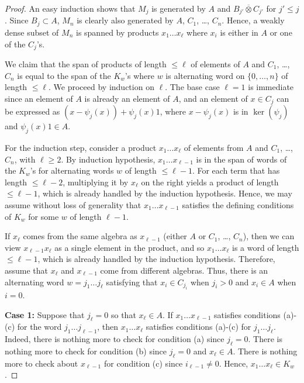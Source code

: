 \documentclass[10pt]{amsart}
\numberwithin{equation}{section}
\theoremstyle{definition}
\newcommand{\ootimes}{\mathbin{\overline{\otimes}}}
\begin{document}
\begin{proof}
	An easy induction shows that $M_j$ is generated by $A$ and $B_{j'} \ootimes C_{j'}$ for $j' \leq j$.  Since $B_j \subset A$, $M_n$ is clearly also generated by $A$, $C_1$, \dots, $C_n$.  Hence, a weakly dense subset of $M_n$ is spanned by products $x_1 \dots x_\ell$ where $x_i$ is either in $A$ or one of the $C_j$'s.
	
	We claim that the span of products of length $\leq \ell$ of elements of $A$ and $C_1$, \dots, $C_n$ is equal to the span of the $K_w$'s where $w$ is alternating word on $\{0,\dots,n\}$ of length $\leq \ell$.  We proceed by induction on $\ell$.  The base case $\ell = 1$ is immediate since an element of $A$ is already an element of $A$, and an element of $x \in C_j$ can be expressed as $(x - \psi_j(x)) + \psi_j(x)1$, where $x - \psi_j(x)$ is in $\ker(\psi_j)$ and $\psi_j(x)1 \in A$.
	
	For the induction step, consider a product $x_1 \dots x_\ell$ of elements from $A$ and $C_1$, \dots, $C_n$, with $\ell \geq 2$.  By induction hypothesis, $x_1 \dots x_{\ell - 1}$ is in the span of words of the $K_w$'s for alternating words $w$ of length $\leq \ell - 1$. For each term that has length $\leq \ell - 2$, multiplying it by $x_\ell$ on the right yields a product of length $\leq \ell - 1$, which is already handled by the induction hypothesis. Hence, we may assume without loss of generality that $x_1 \dots x_{\ell - 1}$ satisfies the defining conditions of $K_w$ for some $w$ of length $\ell - 1$.
	
	If $x_\ell$ comes from the same algebra as $x_{\ell - 1}$ (either $A$ or $C_1$, \dots, $C_n$), then we can view $x_{\ell - 1} x_\ell$ as a single element in the product, and so $x_1 \dots x_\ell$ is a word of length $\leq \ell - 1$, which is already handled by the induction hypothesis.  Therefore, assume that $x_\ell$ and $x_{\ell - 1}$ come from different algebras.  Thus, there is an alternating word $w = j_1 \dots j_\ell$ satisfying that $x_i \in C_{j_i}$ when $j_i > 0$ and $x_i \in A$ when $i = 0$. 
	
	\textbf{Case 1:} Suppose that $j_\ell = 0$ so that $x_\ell \in A$.  If $x_1 \dots x_{\ell-1}$ satisfies conditions (a)-(c) for the word $j_1 \dots j_{\ell-1}$, then $x_1 \dots x_\ell$ satisfies conditions (a)-(c) for $j_1 \dots j_\ell$.  Indeed, there is nothing more to check for condition (a) since $j_\ell = 0$.  There is nothing more to check for condition (b) since $j_\ell = 0$ and $x_\ell \in A$.  There is nothing more to check about $x_{\ell-1}$ for condition (c) since $i_{\ell-1} \neq 0$.  Hence, $x_1 \dots x_\ell \in K_w$.
	

\end{proof}
\end{document}

